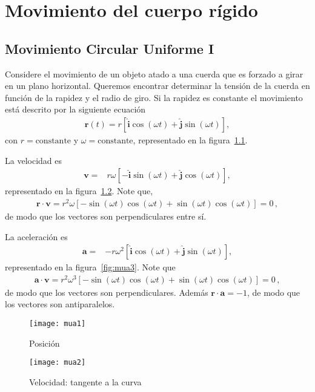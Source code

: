 
\chapter{Movimiento del cuerpo rígido}

\section{Movimiento Circular Uniforme I}


Considere el movimiento de un objeto atado a una cuerda que es forzado a girar en un plano horizontal. Queremos encontrar determinar la tensión de la cuerda en función de la rapidez y el radio de giro. Si la rapidez es constante el movimiento está descrito por la siguiente ecuación
\begin{align}
  \label{eq:mua}
  \mathbf{r}(t)=r\left[\hat{\mathbf{i}}\cos(\omega t)+\hat{\mathbf{j}}\sin(\omega t)\right],
\end{align}
con $r=\text{constante}$ y $\omega=\text{constante}$, representado en la figura~\ref{fig:mua1}.

La velocidad es
\begin{align}
  \mathbf{v}=&%
  r\omega\left[-\hat{\mathbf{i}}\sin(\omega t)+\hat{\mathbf{j}}\cos(\omega t)\right],
\end{align}
representado en la figura~\ref{fig:mua2}. Note que, 
\begin{align*}
\mathbf{r}\cdot\mathbf{v}=r^2\omega 
   \left[-\sin(\omega t)\cos(\omega t)+\sin(\omega t)\cos(\omega t) \right]
  =0\,,
\end{align*}
de modo que los vectores son perpendiculares entre sí.

La aceleración es
\begin{align}
  \mathbf{a}=&%
  -r\omega^2\left[\hat{\mathbf{i}}\cos(\omega t)+\hat{\mathbf{j}}\sin(\omega t)\right],
\end{align}
representado en la figura~\ref{fig:mua3}. Note que
\begin{align*}
  \mathbf{a}\cdot\mathbf{v}=r^2\omega^3 
   \left[-\sin(\omega t)\cos(\omega t)+\sin(\omega t)\cos(\omega t) \right]
  =0\,,
\end{align*}
de modo que los vectores son perpendiculares. Además 
$\mathbf{r}\cdot\mathbf{a}=-1$, de modo que los vectores son antiparalelos.


\begin{frame}
  \begin{figure}
    \centering
    \texttt{[image: mua1]}    
    \caption{Posici\'on}
    \label{fig:mua1}
  \end{figure}

\end{frame}
\begin{frame}
  \begin{figure}
    \centering
    \texttt{[image: mua2]}    
    \caption{Velocidad: tangente a la curva}
    \label{fig:mua2}
  \end{figure}
\end{frame}

